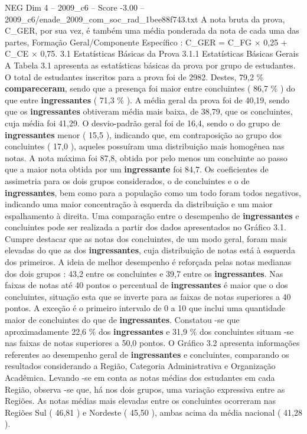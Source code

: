 \begin{textsample}{NEG Dim 4 – 2009\_c6 – Score -3.00 – 2009\_c6/enade\_2009\_com\_soc\_rad\_1bee88f743.txt}
A nota bruta da prova, C\_GER, por sua vez, é também uma média ponderada da nota de cada uma das partes, Formação Geral/Componente Específico : C\_GER = C\_FG × 0,25 + C\_CE × 0,75. 3.1 Estatísticas Básicas da Prova 3.1.1 Estatísticas Básicas Gerais A Tabela 3.1 apresenta as estatísticas básicas da prova por grupo de estudantes.
O total de estudantes inscritos para a prova foi de 2982.
Destes, 79,2 \% \textbf{compareceram}, sendo que a presença foi maior entre concluintes ( 86,7 \% ) do que entre \textbf{ingressantes} ( 71,3 \% ).
A média geral da prova foi de 40,19, sendo que os \textbf{ingressantes} obtiveram média mais baixa, de 38,79, que os concluintes, cuja média foi 41,29.
O desvio-padrão geral foi de 16,4, sendo o do grupo de \textbf{ingressantes} menor ( 15,5 ), indicando que, em contraposição ao grupo dos concluintes ( 17,0 ), aqueles possuíram uma distribuição mais homogênea nas notas.
A nota máxima foi 87,8, obtida por pelo menos um concluinte ao passo que a maior nota obtida por um \textbf{ingressante} foi 84,7.
Os coeficientes de assimetria para os dois grupos considerados, o de concluintes e o de \textbf{ingressantes}, bem como para a população como um todo foram todos negativos, indicando uma maior concentração à esquerda da distribuição e um maior espalhamento à direita.
Uma comparação entre o desempenho de \textbf{ingressantes} e concluintes pode ser realizada a partir dos dados apresentados no Gráfico 3.1.
Cumpre destacar que as notas dos concluintes, de um modo geral, foram mais elevadas do que as dos \textbf{ingressantes}, cuja distribuição de notas está à esquerda dos primeiros.
A ideia de melhor desempenho é reforçada pelas notas medianas dos dois grupos : 43,2 entre os concluintes e 39,7 entre os \textbf{ingressantes}.
Nas faixas de notas até 40 pontos o percentual de \textbf{ingressantes} é maior que o dos concluintes, situação esta que se inverte para as faixas de notas superiores a 40 pontos.
A exceção é o primeiro intervalo de 0 a 10 que inclui uma quantidade maior de concluintes do que de \textbf{ingressantes}.
Constatou -se que aproximadamente 22,6 \% dos \textbf{ingressantes} e 31,9 \% dos concluintes situam -se nas faixas de notas superiores a 50,0 pontos.
O Gráfico 3.2 apresenta informações referentes ao desempenho geral de \textbf{ingressantes} e concluintes, comparando os resultados considerando a Região, Categoria Administrativa e Organização Acadêmica.
Levando -se em conta as notas médias dos estudantes em cada Região, observa -se que, há nos dois grupos, uma variação expressiva entre as Regiões.
As notas médias mais elevadas entre os concluintes ocorreram nas Regiões Sul ( 46,81 ) e Nordeste ( 45,50 ), ambas acima da média nacional ( 41,28 ).

\end{textsample}
